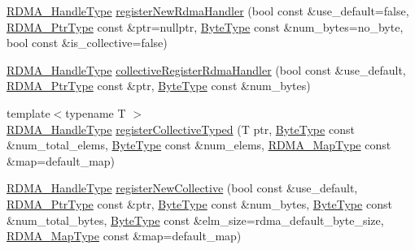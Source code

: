 \begin{DoxyCompactItemize}
\item 
\hyperlink{namespacevt_a10442579ec4e7ebef223818e64bcf908}{R\+D\+M\+A\+\_\+\+Handle\+Type} \hyperlink{structvt_1_1rdma_1_1_r_d_m_a_manager_ab68308f4b3b72714f81a00755736b0b5}{register\+New\+Rdma\+Handler} (bool const \&use\+\_\+default=false, \hyperlink{namespacevt_a9e2c953286c7616f7c218e9951790776}{R\+D\+M\+A\+\_\+\+Ptr\+Type} const \&ptr=nullptr, \hyperlink{namespacevt_aab8d55968084610ce3b17057981e9300}{Byte\+Type} const \&num\+\_\+bytes=no\+\_\+byte, bool const \&is\+\_\+collective=false)
\item 
\hyperlink{namespacevt_a10442579ec4e7ebef223818e64bcf908}{R\+D\+M\+A\+\_\+\+Handle\+Type} \hyperlink{structvt_1_1rdma_1_1_r_d_m_a_manager_a526b7c441125a9d5ed9528736be97819}{collective\+Register\+Rdma\+Handler} (bool const \&use\+\_\+default, \hyperlink{namespacevt_a9e2c953286c7616f7c218e9951790776}{R\+D\+M\+A\+\_\+\+Ptr\+Type} const \&ptr, \hyperlink{namespacevt_aab8d55968084610ce3b17057981e9300}{Byte\+Type} const \&num\+\_\+bytes)
\item 
{\footnotesize template$<$typename T $>$ }\\\hyperlink{namespacevt_a10442579ec4e7ebef223818e64bcf908}{R\+D\+M\+A\+\_\+\+Handle\+Type} \hyperlink{structvt_1_1rdma_1_1_r_d_m_a_manager_ad851bdc250182163eb4996888ba1b863}{register\+Collective\+Typed} (T ptr, \hyperlink{namespacevt_aab8d55968084610ce3b17057981e9300}{Byte\+Type} const \&num\+\_\+total\+\_\+elems, \hyperlink{namespacevt_aab8d55968084610ce3b17057981e9300}{Byte\+Type} const \&num\+\_\+elems, \hyperlink{structvt_1_1rdma_1_1_r_d_m_a_manager_a16e12d11cf7d771df0d3dc6947a4f95c}{R\+D\+M\+A\+\_\+\+Map\+Type} const \&map=default\+\_\+map)
\item 
\hyperlink{namespacevt_a10442579ec4e7ebef223818e64bcf908}{R\+D\+M\+A\+\_\+\+Handle\+Type} \hyperlink{structvt_1_1rdma_1_1_r_d_m_a_manager_a339763a690f218c3df58268a691ecfe4}{register\+New\+Collective} (bool const \&use\+\_\+default, \hyperlink{namespacevt_a9e2c953286c7616f7c218e9951790776}{R\+D\+M\+A\+\_\+\+Ptr\+Type} const \&ptr, \hyperlink{namespacevt_aab8d55968084610ce3b17057981e9300}{Byte\+Type} const \&num\+\_\+bytes, \hyperlink{namespacevt_aab8d55968084610ce3b17057981e9300}{Byte\+Type} const \&num\+\_\+total\+\_\+bytes, \hyperlink{namespacevt_aab8d55968084610ce3b17057981e9300}{Byte\+Type} const \&elm\+\_\+size=rdma\+\_\+default\+\_\+byte\+\_\+size, \hyperlink{structvt_1_1rdma_1_1_r_d_m_a_manager_a16e12d11cf7d771df0d3dc6947a4f95c}{R\+D\+M\+A\+\_\+\+Map\+Type} const \&map=default\+\_\+map)
\item 

\end{DoxyCompactItemize}
